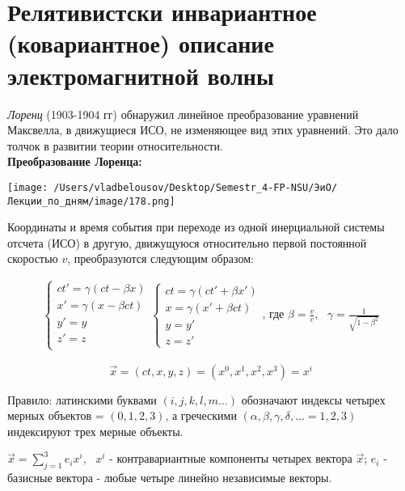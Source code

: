 \documentclass[12pt, a4paper]{report}
\begin{document}
\fi

\section{Релятивистски инвариантное (ковариантное) описание электромагнитной волны}

\textit{Лоренц}  (1903-1904 гг) обнаружил линейное преобразование уравнений Максвелла, в движущиеся ИСО, не изменяющее вид этих уравнений. Это дало толчок в развитии теории относительности. \\

\textbf{Преобразование Лоренца:}  

\begin{center}
    \texttt{[image: /Users/vladbelousov/Desktop/Semestr\_4-FP-NSU/ЭиО/Лекции\_по\_дням/image/178.png]}
\end{center}

Координаты и время события при переходе из одной инерциальной системы отсчета (ИСО) в другую, движущуюся относительно первой постоянной скоростью \( v \), преобразуются следующим образом: 

\[ \begin{aligned}
\begin{cases}
c t ' = \gamma (ct - \beta x ) \\ 
x ' = \gamma (x - \beta ct ) \\ 
y ' = y \\ 
z ' = z \\ 
\end{cases}
\begin{cases}
ct = \gamma (c t ' + \beta x ' ) \\ 
x = \gamma (x ' + \beta ct ) \\ 
y = y ' \\
z = z' 
\end{cases}
\text{, где } \beta = \frac{v}{c }  , \text{ }  \gamma = \frac{1}{\sqrt{1 - \beta ^2 } }  
\end{aligned} \] 

\[ \vec{x }  = (ct , x , y ,z ) =(x^0 , x^1 , x^2 ,x^3 )= x^i  \] 

Правило: латинскими буквами \( (i , j  , k , l ,m ... ) \)  обозначают  индексы четырех мерных объектов = \( (0, 1, 2 ,3) \), а греческими \( (\alpha , \beta , \gamma , \delta ,... = 1,2,3) \) индексируют трех мерные объекты. 

\( \displaystyle  \vec{ x }  = \sum_{j =1}^3 e_i x^i    , \text{ }  x^i  \) - контравариантные компоненты четырех вектора \( \vec{x}  \); \( e_i \) - базисные вектора - любые четыре линейно независимые векторы. 
\end{document}
